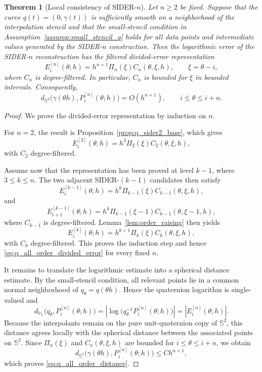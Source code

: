 \documentclass[a4paper,11pt]{article}
\newcommand{\bS}{\mathbb{S}}
\newcommand{\bH}{\mathbb{H}}
\numberwithin{equation}{section}
\theoremstyle{plain}
\newtheorem{thm}{Theorem}[section]
\theoremstyle{definition}
\theoremstyle{remark}
\begin{document}
\begin{thm}[Local consistency of SIDER-\(n\)]
\label{thm:q_all_order}
Let \(n\geq2\) be fixed.  Suppose that the curve \(q(t)=(0,\gamma(t))\) is
sufficiently smooth on a neighborhood of the interpolation stencil and that
the small-stencil condition in Assumption~\ref{assump:small_stencil_q} holds
for all data points and intermediate values generated by the SIDER-\(n\)
construction.  Then the logarithmic error of the SIDER-\(n\) reconstruction
has the filtered divided-error representation
\begin{equation}
\label{eq:q_all_order_divided_error}
        E_i^{[n]}(\theta;h)
        =
        h^{n+1}\Pi_n(\xi)C_n(\theta,\xi,h),
        \qquad
        \xi=\theta-i,
\end{equation}
where \(C_n\) is degree-filtered.  In particular, \(C_n\) is bounded for
\(\xi\) in bounded intervals.  Consequently,
\begin{equation}
\label{eq:q_all_order_distance}
        d_{\bS^2}\bigl(\gamma(\theta h),P_i^{[n]}(\theta;h)\bigr)
        =
        O(h^{n+1}),
        \qquad
        i\leq\theta\leq i+n .
\end{equation}
\end{thm}

\begin{proof}
We prove the divided-error representation by induction on \(n\).

For \(n=2\), the result is Proposition~\ref{prop:q_sider2_base}, which gives
\[
        E_i^{[2]}(\theta;h)
        =
        h^3\Pi_2(\xi)C_2(\theta,\xi,h),
\]
with \(C_2\) degree-filtered.

Assume now that the representation has been proved at level \(k-1\), where
\(3\leq k\leq n\).  The two adjacent SIDER-\((k-1)\) candidates then satisfy
\[
        E_i^{[k-1]}(\theta;h)
        =
        h^k\Pi_{k-1}(\xi)C_{k-1}(\theta,\xi,h),
\]
and
\[
        E_{i+1}^{[k-1]}(\theta;h)
        =
        h^k\Pi_{k-1}(\xi-1)C_{k-1}(\theta,\xi-1,h),
\]
where \(C_{k-1}\) is degree-filtered.  Lemma~\ref{lem:order_raising} then
yields
\[
        E_i^{[k]}(\theta;h)
        =
        h^{k+1}\Pi_k(\xi)C_k(\theta,\xi,h),
\]
with \(C_k\) degree-filtered.  This proves the induction step and hence
\eqref{eq:q_all_order_divided_error} for every fixed \(n\).

It remains to translate the logarithmic estimate into a spherical distance
estimate.  By the small-stencil condition, all relevant points lie in a common
normal neighborhood of \(q_\theta=q(\theta h)\).  Hence the quaternion
logarithm is single-valued and
\[
        d_{\bH_1}\bigl(q_\theta,P_i^{[n]}(\theta;h)\bigr)
        =
        \left|
        \log\bigl(q_\theta^{-1}P_i^{[n]}(\theta;h)\bigr)
        \right|
        =
        |E_i^{[n]}(\theta;h)|.
\]
Because the interpolants remain on the pure unit-quaternion copy of
\(\bS^2\), this distance agrees locally with the spherical distance between
the associated points on \(\bS^2\).  Since \(\Pi_n(\xi)\) and
\(C_n(\theta,\xi,h)\) are bounded for \(i\leq\theta\leq i+n\), we obtain
\[
        d_{\bS^2}\bigl(\gamma(\theta h),P_i^{[n]}(\theta;h)\bigr)
        \leq
        C h^{n+1},
\]
which proves \eqref{eq:q_all_order_distance}.
\end{proof}
\end{document}
